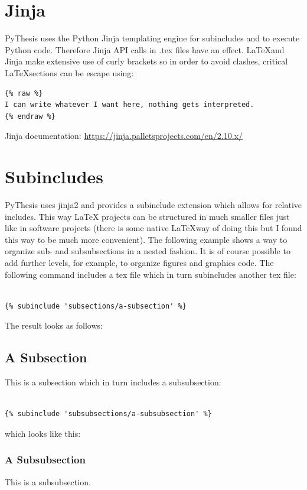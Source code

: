 \documentclass[a4paper]{book}
\begin{document}
\section{Jinja}
\label{sec:jinja}
PyThesis uses the Python Jinja templating engine for subincludes and to execute Python code. Therefore Jinja API calls in .tex files have an effect. \LaTeX and Jinja make extensive use of curly brackets so in order to avoid clashes, critical \LaTeX sections can be escape using:
\begin{verbatim}
{% raw %}
I can write whatever I want here, nothing gets interpreted.
{% endraw %}
\end{verbatim}

Jinja documentation: \url{https://jinja.palletsprojects.com/en/2.10.x/}
\section{Subincludes}
\label{sec:subincludes}
PyThesis uses jinja2 and provides a subinclude extension which allows for relative includes. This way LaTeX projects can be structured in much smaller files just like in software projects (there is some native \LaTeX way of doing this but I found this way to be much more convenient). The following example shows a way to organize sub- and subsubsections in a nested fashion. It is of course possible to add further levels, for example, to organize figures and graphics code. The following command includes a tex file which in turn subincludes another tex file:
\begin{verbatim}

{% subinclude 'subsections/a-subsection' %}

\end{verbatim}
The result looks as follows:
\subsection{A Subsection}
\label{sec:a-subsection}
This is a subsection which in turn includes a subsubsection:
\begin{verbatim}

{% subinclude 'subsubsections/a-subsubsection' %}

\end{verbatim}
which looks like this:
\subsubsection{A Subsubsection}
\label{sec:a-subsubsection}
This is a subsubsection.
\end{document}
